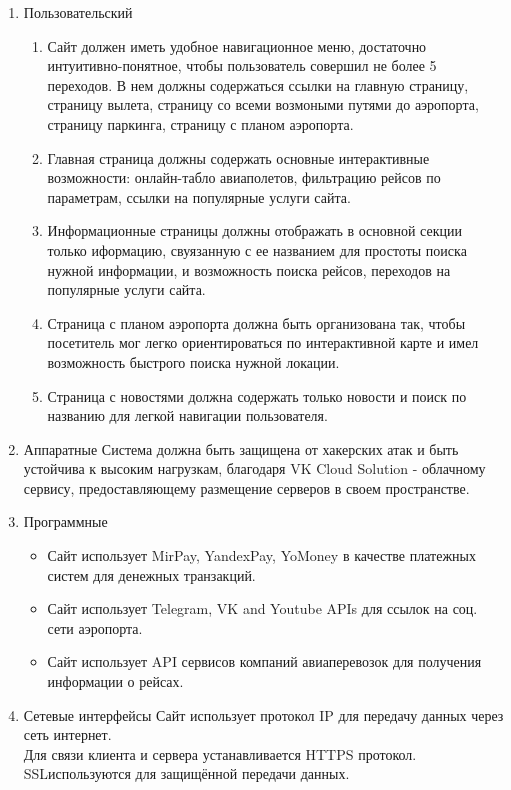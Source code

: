 
\begin{enumerate}
    \item Пользовательский 
    \begin{enumerate}
        \item Сайт должен иметь удобное навигационное меню,
        достаточно интуитивно-понятное, чтобы пользователь совершил не более 
        5 переходов.
        В нем должны содержаться ссылки на главную страницу, страницу вылета,
        страницу со всеми возмоными путями до аэропорта, 
        страницу паркинга, страницу с планом аэропорта.
        \item Главная страница должны содержать основные интерактивные возможности:
        онлайн-табло авиаполетов, фильтрацию рейсов по параметрам,
        ссылки на популярные услуги сайта.
        \item Информационные страницы должны отображать в основной секции только иформацию,
            свуязанную с ее названием для простоты поиска нужной информации,
            и возможность поиска рейсов, переходов на популярные услуги сайта.
        \item Страница с планом аэропорта должна быть организована так, чтобы
            посетитель мог легко ориентироваться по интерактивной карте и имел возможность
            быстрого поиска нужной локации.
        \item Страница с новостями должна содержать только новости и 
        поиск по названию для легкой навигации пользователя.
    \end{enumerate}
    \item Аппаратные
    Система должна быть защищена от хакерских атак и быть устойчива к высоким нагрузкам, благодаря 
    VK Cloud Solution - облачному сервису, предоставляющему размещение серверов в своем пространстве.
    \item Программные
    \begin{itemize}
        \item Сайт использует MirPay, YandexPay, YoMoney в качестве платежных систем для денежных транзакций.
        \item Сайт использует Telegram, VK and Youtube APIs для ссылок на соц. сети аэропорта.
        \item Сайт использует API сервисов компаний авиаперевозок для получения информации о рейсах.
    \end{itemize}
    \item Сетевые интерфейсы
        Сайт использует протокол IP для передачу данных через сеть интернет.
        \\
        Для связи клиента и сервера устанавливается HTTPS протокол.
        \\
        SSL\TLS используются для защищённой передачи данных.
\end{enumerate}